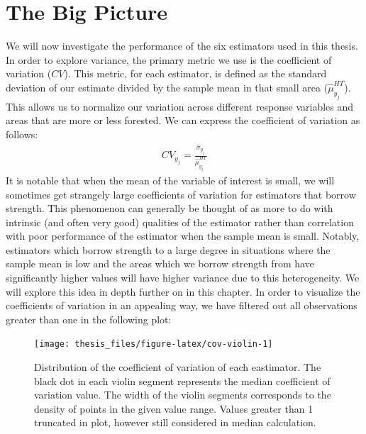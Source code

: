 \documentclass[12pt,twoside]{reedthesis}
\begin{document}
\hypertarget{the-big-picture}{%
\section{The Big Picture}\label{the-big-picture}}

We will now investigate the performance of the six estimators used in this thesis. In order to explore variance, the primary metric we use is the coefficient of variation (\(CV\)). This metric, for each estimator, is defined as the standard deviation of our estimate divided by the sample mean in that small area (\(\hat \mu_{y_j}^{HT}\)). This allows us to normalize our variation across different response variables and areas that are more or less forested. We can express the coefficient of variation as follows:
\begin{align}
CV_{y_j} = \frac{\hat\sigma_{y_j}}{\hat\mu_{y_j}^{HT}}
\end{align}
It is notable that when the mean of the variable of interest is small, we will sometimes get strangely large coefficients of variation for estimators that borrow strength. This phenomenon can generally be thought of as more to do with intrinsic (and often very good) qualities of the estimator rather than correlation with poor performance of the estimator when the sample mean is small. Notably, estimators which borrow strength to a large degree in situations where the sample mean is low and the areas which we borrow strength from have significantly higher values will have higher variance due to this heterogeneity. We will explore this idea in depth further on in this chapter.
\clearpage
In order to visualize the coefficients of variation in an appealing way, we have filtered out all observations greater than one in the following plot:
\begin{figure}

{\centering \texttt{[image: thesis\_files/figure-latex/cov-violin-1]} 

}

\caption[Distribution of the coefficient of variation of each eastimator]{Distribution of the coefficient of variation of each eastimator. The black dot in each violin segment represents the median coefficient of variation value. The width of the violin segments corresponds to the density of points in the given value range. Values greater than 1 truncated in plot, however still considered in median calculation.}\label{fig:cov-violin}
\end{figure}
\end{document}
